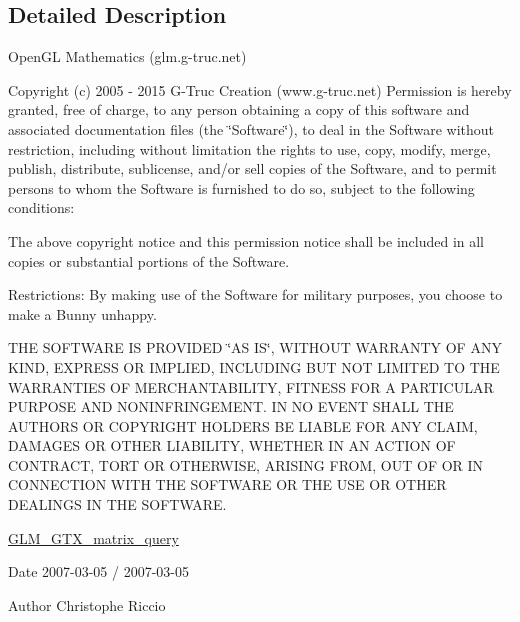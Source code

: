 \subsection{Detailed Description}
Open\+G\+L Mathematics (glm.\+g-\/truc.\+net)

Copyright (c) 2005 -\/ 2015 G-\/\+Truc Creation (www.\+g-\/truc.\+net) Permission is hereby granted, free of charge, to any person obtaining a copy of this software and associated documentation files (the \char`\"{}\+Software\char`\"{}), to deal in the Software without restriction, including without limitation the rights to use, copy, modify, merge, publish, distribute, sublicense, and/or sell copies of the Software, and to permit persons to whom the Software is furnished to do so, subject to the following conditions\+:

The above copyright notice and this permission notice shall be included in all copies or substantial portions of the Software.

Restrictions\+: By making use of the Software for military purposes, you choose to make a Bunny unhappy.

T\+H\+E S\+O\+F\+T\+W\+A\+R\+E I\+S P\+R\+O\+V\+I\+D\+E\+D \char`\"{}\+A\+S I\+S\char`\"{}, W\+I\+T\+H\+O\+U\+T W\+A\+R\+R\+A\+N\+T\+Y O\+F A\+N\+Y K\+I\+N\+D, E\+X\+P\+R\+E\+S\+S O\+R I\+M\+P\+L\+I\+E\+D, I\+N\+C\+L\+U\+D\+I\+N\+G B\+U\+T N\+O\+T L\+I\+M\+I\+T\+E\+D T\+O T\+H\+E W\+A\+R\+R\+A\+N\+T\+I\+E\+S O\+F M\+E\+R\+C\+H\+A\+N\+T\+A\+B\+I\+L\+I\+T\+Y, F\+I\+T\+N\+E\+S\+S F\+O\+R A P\+A\+R\+T\+I\+C\+U\+L\+A\+R P\+U\+R\+P\+O\+S\+E A\+N\+D N\+O\+N\+I\+N\+F\+R\+I\+N\+G\+E\+M\+E\+N\+T. I\+N N\+O E\+V\+E\+N\+T S\+H\+A\+L\+L T\+H\+E A\+U\+T\+H\+O\+R\+S O\+R C\+O\+P\+Y\+R\+I\+G\+H\+T H\+O\+L\+D\+E\+R\+S B\+E L\+I\+A\+B\+L\+E F\+O\+R A\+N\+Y C\+L\+A\+I\+M, D\+A\+M\+A\+G\+E\+S O\+R O\+T\+H\+E\+R L\+I\+A\+B\+I\+L\+I\+T\+Y, W\+H\+E\+T\+H\+E\+R I\+N A\+N A\+C\+T\+I\+O\+N O\+F C\+O\+N\+T\+R\+A\+C\+T, T\+O\+R\+T O\+R O\+T\+H\+E\+R\+W\+I\+S\+E, A\+R\+I\+S\+I\+N\+G F\+R\+O\+M, O\+U\+T O\+F O\+R I\+N C\+O\+N\+N\+E\+C\+T\+I\+O\+N W\+I\+T\+H T\+H\+E S\+O\+F\+T\+W\+A\+R\+E O\+R T\+H\+E U\+S\+E O\+R O\+T\+H\+E\+R D\+E\+A\+L\+I\+N\+G\+S I\+N T\+H\+E S\+O\+F\+T\+W\+A\+R\+E.

\hyperlink{group__gtx__matrix__query}{G\+L\+M\+\_\+\+G\+T\+X\+\_\+matrix\+\_\+query}

\begin{DoxyDate}{Date}
2007-\/03-\/05 / 2007-\/03-\/05 
\end{DoxyDate}
\begin{DoxyAuthor}{Author}
Christophe Riccio 
\end{DoxyAuthor}

